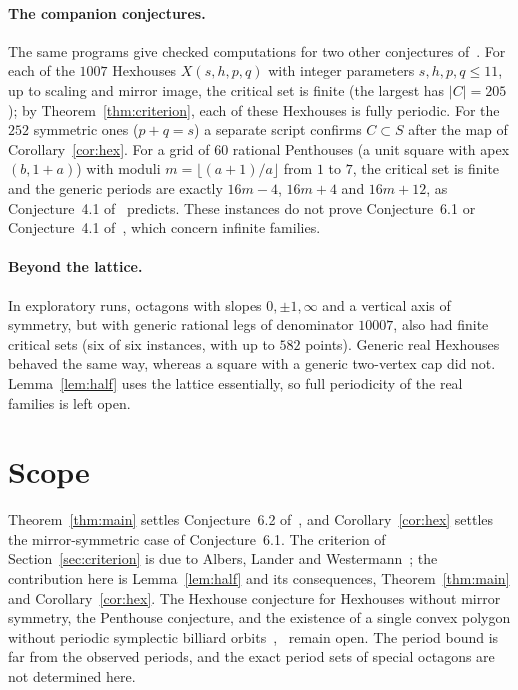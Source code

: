 \documentclass[11pt]{amsart}
\theoremstyle{definition}
\theoremstyle{remark}
\begin{document}
\paragraph{The companion conjectures.} The same programs give checked computations for two other conjectures of~\cite{ABS25}. For each of the $1007$ Hexhouses $X(s,h,p,q)$ with integer parameters $s,h,p,q\le11$, up to scaling and mirror image, the critical set is finite (the largest has $|C|=205$); by Theorem~\ref{thm:criterion}, each of these Hexhouses is fully periodic. For the $252$ symmetric ones ($p+q=s$) a separate script confirms $C\subset S$ after the map of Corollary~\ref{cor:hex}. For a grid of $60$ rational Penthouses (a unit square with apex $(b,1+a)$) with moduli $m=\lfloor(a+1)/a\rfloor$ from $1$ to $7$, the critical set is finite and the generic periods are exactly $16m-4$, $16m+4$ and $16m+12$, as Conjecture~4.1 of~\cite{ABS25} predicts. These instances do not prove Conjecture~6.1 or Conjecture~4.1 of~\cite{ABS25}, which concern infinite families.

\paragraph{Beyond the lattice.} In exploratory runs, octagons with slopes $0,\pm1,\infty$ and a vertical axis of symmetry, but with generic rational legs of denominator $10007$, also had finite critical sets (six of six instances, with up to $582$ points). Generic real Hexhouses behaved the same way, whereas a square with a generic two-vertex cap did not. Lemma~\ref{lem:half} uses the lattice essentially, so full periodicity of the real families is left open.

\section{Scope}

Theorem~\ref{thm:main} settles Conjecture~6.2 of~\cite{ABS25}, and Corollary~\ref{cor:hex} settles the mirror-symmetric case of Conjecture~6.1. The criterion of Section~\ref{sec:criterion} is due to Albers, Lander and Westermann~\cite{ALW26}; the contribution here is Lemma~\ref{lem:half} and its consequences, Theorem~\ref{thm:main} and Corollary~\ref{cor:hex}. The Hexhouse conjecture for Hexhouses without mirror symmetry, the Penthouse conjecture, and the existence of a single convex polygon without periodic symplectic billiard orbits~\cite[Question~7.1]{ABS25},~\cite{ALW26} remain open. The period bound is far from the observed periods, and the exact period sets of special octagons are not determined here.
\end{document}
